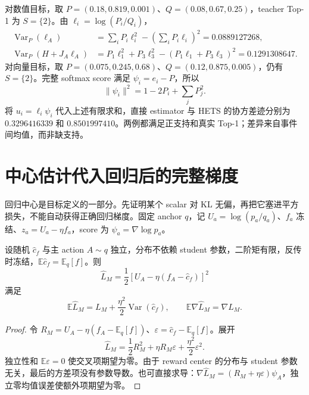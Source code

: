 \documentclass[lang=cn,scheme=chinese,openany]{../book/elegantbook}
\newcommand{\E}{\mathbb E}
\newcommand{\Var}{\operatorname{Var}}
\begin{document}
对数值目标，取 $P=(0.18,0.819,0.001)$、$Q=(0.08,0.67,0.25)$，teacher Top-1 为 $S=\{2\}$。由 $\ell_i=\log(P_i/Q_i)$，
\begin{align}
\Var_P(\ell_A)&=\sum_iP_i\ell_i^2-(\sum_iP_i\ell_i)^2=0.0889127268,\\
\Var_P(H+J_A\ell_A)&=P_1\ell_1^2+P_3\ell_3^2-(P_1\ell_1+P_3\ell_3)^2=0.1291308647.
\end{align}
对向量目标，取 $P=(0.075,0.245,0.68)$、$Q=(0.12,0.875,0.005)$，仍有 $S=\{2\}$。完整 softmax score 满足 $\psi_i=e_i-P$，所以
\begin{equation}
\|\psi_i\|^2=1-2P_i+\sum_jP_j^2.
\end{equation}
将 $u_i=\ell_i\psi_i$ 代入上述有限求和，直接 estimator 与 HETS 的协方差迹分别为 $0.3296416339$ 和 $0.8501997410$。两例都满足正支持和真实 Top-1；差异来自事件间均值，而非缺支持。



\section{中心估计代入回归后的完整梯度}
\label{est:inner}

回归中心是目标定义的一部分。先证明某个 scalar 对 KL 无偏，再把它塞进平方损失，不能自动获得正确回归梯度。固定 anchor $q$，记 $U_a=\log(p_a/q_a)$、$f_a$ 冻结、$z_a=U_a-\eta f_a$，score 为 $\psi_a=\nabla\log p_a$。

\begin{proposition}
\label{est:mean-center}
设随机 $\widehat c_f$ 与主 action $A\sim q$ 独立，分布不依赖 student 参数，二阶矩有限，反传时冻结，$\E\widehat c_f=\E_q[f]$。则
\begin{equation}
\widehat L_M=\frac12[U_A-\eta(f_A-\widehat c_f)]^2
\end{equation}
满足
\begin{equation}
\E\widehat L_M=L_M+\frac{\eta^2}{2}\Var(\widehat c_f),\qquad
\E\nabla\widehat L_M=\nabla L_M.
\end{equation}
\end{proposition}
\begin{proof}
令 $R_M=U_A-\eta(f_A-\E_q[f])$、$\varepsilon=\widehat c_f-\E_q[f]$。展开
\begin{equation}
\widehat L_M=\frac12R_M^2+\eta R_M\varepsilon+\frac{\eta^2}{2}\varepsilon^2.
\end{equation}
独立性和 $\E\varepsilon=0$ 使交叉项期望为零。由于 reward center 的分布与 student 参数无关，最后的方差项没有参数导数。也可直接求导：$\nabla\widehat L_M=(R_M+\eta\varepsilon)\psi_A$，独立零均值误差使额外项期望为零。
\end{proof}
\end{document}
